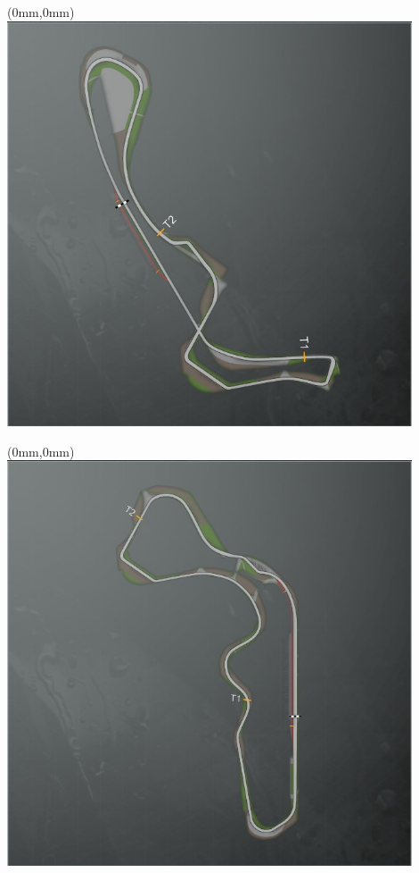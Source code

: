 \null\newpage
\begin{textblock*}{30mm}(0mm,0mm)%
\includegraphics[width=120mm]{TR/2015-05-20_00054.png}
\end{textblock*}
\null\newpage
\begin{textblock*}{30mm}(0mm,0mm)%
\includegraphics[width=120mm]{TR/2015-05-20_00053.png}
\end{textblock*}
